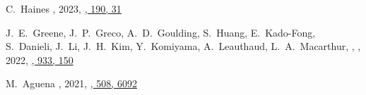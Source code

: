 \begin{etaremune}
\item
C.~Haines 
,
2023, \href{https://ui.adsabs.harvard.edu/abs/2023Msngr.190...31H/abstract}{\msngr, 190, 31}

\item
J.~E.~Greene, J.~P.~Greco, A.~D.~Goulding, S.~Huang, E.~Kado-Fong, S.~Danieli, J.~Li, J.~H.~Kim, Y.~Komiyama, A.~Leauthaud, L.~A.~Macarthur, \myself,
,
2022, \href{https://ui.adsabs.harvard.edu/abs/2022ApJ...933..150G/abstract}{\apj, 933, 150}

\item
M.~Aguena 
,
2021, \href{https://ui.adsabs.harvard.edu/abs/2021MNRAS.508.6092A/abstract}{\mnras, 508, 6092}

\end{etaremune}
